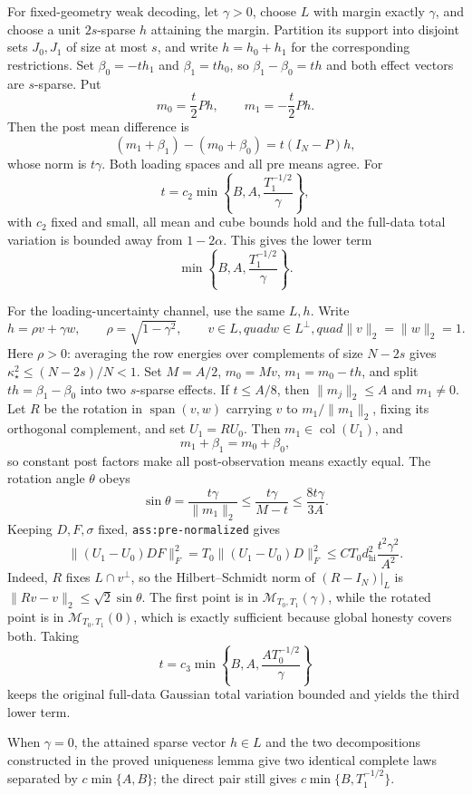 For fixed-geometry weak decoding, let \(\gamma>0\), choose \(L\) with margin exactly \(\gamma\), and choose a unit \(2s\)-sparse \(h\) attaining the margin.  Partition its support into disjoint sets \(J_0,J_1\) of size at most \(s\), and write \(h=h_0+h_1\) for the corresponding restrictions.  Set \(\beta_0=-th_1\) and \(\beta_1=th_0\), so \(\beta_1-\beta_0=th\) and both effect vectors are \(s\)-sparse.  Put
\[
 m_0=\frac t2Ph,
 \qquad m_1=-\frac t2Ph.
\]
Then the post mean difference is
\[
 (m_1+\beta_1)-(m_0+\beta_0)=t(I_N-P)h,
\]
whose norm is \(t\gamma\).  Both loading spaces and all pre means agree.  For
\[
 t=c_2\min\left\{B,A,\frac{T_1^{-1/2}}{\gamma}\right\},
\]
with \(c_2\) fixed and small, all mean and cube bounds hold and the full-data total variation is bounded away from \(1-2\alpha\).  This gives the lower term
\[
 \min\left\{B,A,\frac{T_1^{-1/2}}{\gamma}\right\}.
\]

For the loading-uncertainty channel, use the same \(L,h\).  Write
\[
 h=\rho v+\gamma w,
 \qquad \rho=\sqrt{1-\gamma^2},
 \qquad v\in L,quad w\in L^\perp,quad \lVert v\rVert_2=\lVert w\rVert_2=1.
\]
Here \(\rho>0\): averaging the row energies over complements of size \(N-2s\) gives \(\kappa_\star^2\le(N-2s)/N<1\).  Set \(M=A/2\), \(m_0=Mv\), \(m_1=m_0-th\), and split \(th=\beta_1-\beta_0\) into two \(s\)-sparse effects.  If \(t\le A/8\), then \(\lVert m_j\rVert_2\le A\) and \(m_1\ne0\).  Let \(R\) be the rotation in \(\operatorname{span}(v,w)\) carrying \(v\) to \(m_1/\lVert m_1\rVert_2\), fixing its orthogonal complement, and set \(U_1=RU_0\).  Then \(m_1\in\operatorname{col}(U_1)\), and
\[
 m_1+\beta_1=m_0+\beta_0,
\]
so constant post factors make all post-observation means exactly equal.  The rotation angle \(\theta\) obeys
\[
 \sin\theta=\frac{t\gamma}{\lVert m_1\rVert_2}
 \le\frac{t\gamma}{M-t}
 \le\frac{8t\gamma}{3A}.
\]
Keeping \(D,F,\sigma\) fixed, \texttt{ass:pre-normalized} gives
\[
 \lVert(U_1-U_0)DF\rVert_F^2
 =T_0\lVert(U_1-U_0)D\rVert_F^2
 \le C T_0d_{\mathrm{hi}}^2\frac{t^2\gamma^2}{A^2}.
\]
Indeed, \(R\) fixes \(L\cap v^\perp\), so the Hilbert--Schmidt norm of \((R-I_N)|_L\) is \(\lVert Rv-v\rVert_2\le\sqrt2\sin\theta\).  The first point is in \(\mathcal M_{T_0,T_1}(\gamma)\), while the rotated point is in \(\mathcal M_{T_0,T_1}(0)\), which is exactly sufficient because global honesty covers both.  Taking
\[
 t=c_3\min\left\{B,A,\frac{AT_0^{-1/2}}{\gamma}\right\}
\]
keeps the original full-data Gaussian total variation bounded and yields the third lower term.

When \(\gamma=0\), the attained sparse vector \(h\in L\) and the two decompositions constructed in the proved uniqueness lemma give two identical complete laws separated by \(c\min\{A,B\}\); the direct pair still gives \(c\min\{B,T_1^{-1/2}\}\).

